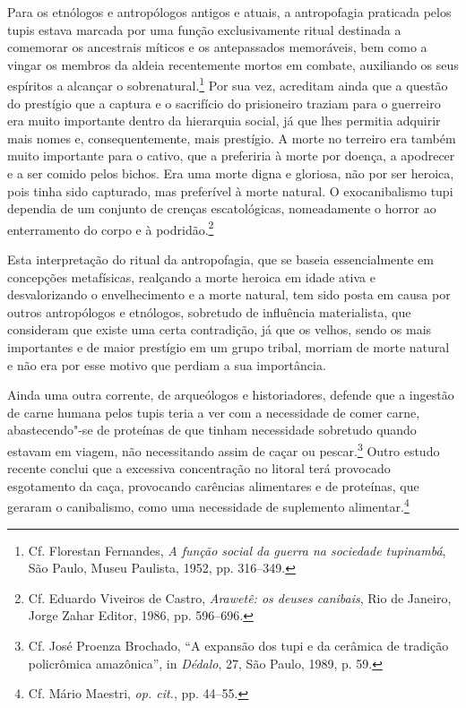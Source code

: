 Para os etnólogos e antropólogos antigos e atuais, a antropofagia
praticada pelos tupis estava marcada por uma função exclusivamente
ritual destinada a comemorar os ancestrais míticos e os antepassados
memoráveis, bem como a vingar os membros da aldeia recentemente mortos
em combate, auxiliando os seus espíritos a alcançar o 
sobrenatural.\footnote{ Cf. Florestan Fernandes, \textit{A função social da
guerra na sociedade tupinambá}, São Paulo, Museu Paulista, 1952, pp. 316--349.} 
Por sua vez, acreditam ainda que a questão do prestígio que a
captura e o sacrifício do prisioneiro traziam para o guerreiro era
muito importante dentro da hierarquia social, já que lhes permitia
adquirir mais nomes e, consequentemente, mais prestígio. A morte no
terreiro era também muito importante para o cativo, que a preferiria à
morte por doença, a apodrecer e a ser comido pelos bichos. Era uma
morte digna e gloriosa, não por ser heroica, pois tinha sido capturado,
mas preferível à morte natural. O exocanibalismo tupi dependia de um
conjunto de crenças escatológicas, nomeadamente o horror ao
enterramento do corpo e à podridão.\footnote{ Cf. Eduardo
Viveiros de Castro, \textit{Arawetê: os deuses canibais}, Rio de
Janeiro, Jorge Zahar Editor, 1986, pp. 596--696.}

Esta interpretação do ritual da antropofagia, que se baseia
essencialmente em concepções metafísicas, realçando a morte heroica em
idade ativa e desvalorizando o envelhecimento e a morte natural, tem
sido posta em causa por outros antropólogos e etnólogos, sobretudo de
influência materialista, que consideram que existe uma certa
contradição, já que os velhos, sendo os mais importantes e de maior
prestígio em um grupo tribal, morriam de morte natural e não era por
esse motivo que perdiam a sua importância.

Ainda uma outra corrente, de arqueólogos e historiadores, defende que
a ingestão de carne humana pelos tupis teria a ver com a necessidade de
comer carne, abastecendo"-se de proteínas de que tinham necessidade
sobretudo quando estavam em viagem, não necessitando assim de caçar ou
pescar.\footnote{ Cf. José Proenza Brochado, ``A expansão dos tupi e
da cerâmica de tradição policrômica amazônica'', in \textit{Dédalo}, 27,
São Paulo, 1989, p. 59.} Outro estudo recente conclui que a excessiva
concentração no litoral terá provocado esgotamento da caça, provocando
carências alimentares e de proteínas, que geraram o canibalismo, como
uma necessidade de suplemento alimentar.\footnote{ Cf. Mário
Maestri, \textit{op. cit.}, pp. 44--55.}

